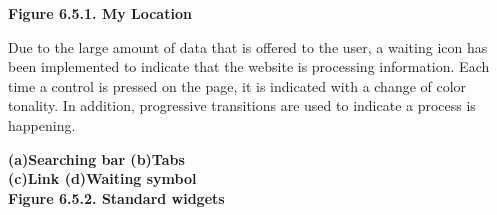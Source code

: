 

\begin{center}
    \bf{ 
    Figure 6.5.1. My Location}
  \end{center} 

Due to the large amount of data that is offered to the user, a waiting icon has been implemented to indicate that the website is processing information.
Each time a control is pressed on the page, it is indicated with a change of color tonality.
In addition, progressive transitions are used to indicate a process is happening.\\

\begin{center}
    \bf{ (a)Searching bar (b)Tabs\\
    (c)Link (d)Waiting symbol\\
    
    Figure 6.5.2. Standard widgets}
  \end{center} 